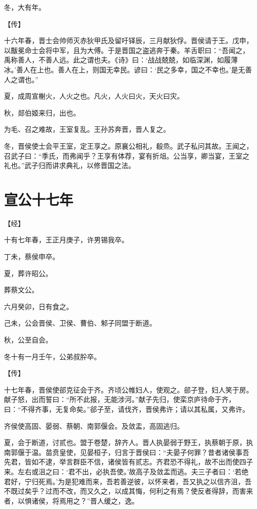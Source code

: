 \documentclass[a4paper,12pt,UTF8,twoside]{ctexbook}
\begin{document}
冬，大有年。

【传】

十六年春，晋士会帅师灭赤狄甲氏及留吁铎辰，三月献狄俘。晋侯请于王。戊申，以黻冕命士会将中军，且为大傅。于是晋国之盗逃奔于秦。羊舌职曰：“吾闻之，禹称善人，不善人远。此之谓也夫。《诗》曰：‘战战兢兢，如临深渊，如履薄冰。’善人在上也。善人在上，则国无幸民。谚曰：‘民之多幸，国之不幸也。’是无善人之谓也。”

夏，成周宣榭火，人火之也。凡火，人火曰火，天火曰灾。

秋，郯伯姬来归，出也。

为毛、召之难故，王室复乱。王孙苏奔晋，晋人复之。

冬，晋侯使士会平王室，定王享之。原襄公相礼，殽烝。武子私问其故。王闻之，召武子曰：“季氏，而弗闻乎？王享有体荐，宴有折俎。公当享，卿当宴，王室之礼也。”武子归而讲求典礼，以修晋国之法。



\section{宣公十七年}


【经】

十有七年春，王正月庚子，许男锡我卒。

丁未，蔡侯申卒。

夏，葬许昭公。

葬蔡文公。

六月癸卯，日有食之。

己未，公会晋侯、卫侯、曹伯、邾子同盟于断道。

秋，公至自会。

冬十有一月壬午，公弟叔肸卒。

【传】

十七年春，晋侯使郤克征会于齐。齐顷公帷妇人，使观之。郤子登，妇人笑于房。献子怒，出而誓曰：“所不此报，无能涉河。”献子先归，使栾京庐待命于齐，曰：“不得齐事，无复命矣。”郤子至，请伐齐，晋侯弗许；请以其私属，又弗许。

齐侯使高固、晏弱、蔡朝、南郭偃会。及敛盂，高固逃归。

夏，会于断道，讨贰也。盟于卷楚，辞齐人。晋人执晏弱于野王，执蔡朝于原，执南郭偃于温。苗贲皇使，见晏桓子，归言于晋侯曰：“夫晏子何罪？昔者诸侯事吾先君，皆如不逮，举言群臣不信，诸侯皆有贰志。齐君恐不得礼，故不出而使四子来。左右或沮之曰：‘君不出，必执吾使。’故高子及敛盂而逃。夫三子者曰：‘若绝君好，宁归死焉。’为是犯难而来，吾若善逆彼，以怀来者，吾又执之以信齐沮，吾不既过矣乎？过而不改，而又久之，以成其悔，何利之有焉？使反者得辞，而害来者，以惧诸侯，将焉用之？”晋人缓之，逸。
\end{document}
